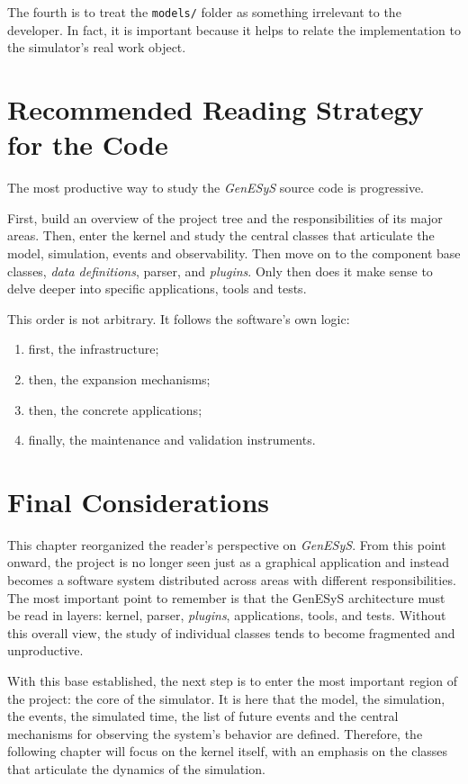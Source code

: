 The fourth is to treat the \texttt{models/} folder as something irrelevant to the developer. In fact, it is important because it helps to relate the implementation to the simulator's real work object.

\section{Recommended Reading Strategy for the Code}
\label{sec:cap6_estrategia_recomendada_leitura}

The most productive way to study the \textit{GenESyS} source code is progressive.

First, build an overview of the project tree and the responsibilities of its major areas. Then, enter the kernel and study the central classes that articulate the model, simulation, events and observability. Then move on to the component base classes, \textit{data definitions}, parser, and \textit{plugins}. Only then does it make sense to delve deeper into specific applications, tools and tests.

This order is not arbitrary. It follows the software's own logic:
\begin{enumerate}
 \item first, the infrastructure;
 \item then, the expansion mechanisms;
 \item then, the concrete applications;
 \item finally, the maintenance and validation instruments.
\end{enumerate}

\section{Final Considerations}
\label{sec:cap6_consideracoes_finais}

This chapter reorganized the reader's perspective on \textit{GenESyS}. From this point onward, the project is no longer seen just as a graphical application and instead becomes a software system distributed across areas with different responsibilities. The most important point to remember is that the GenESyS architecture must be read in layers: kernel, parser, \textit{plugins}, applications, tools, and tests. Without this overall view, the study of individual classes tends to become fragmented and unproductive.

With this base established, the next step is to enter the most important region of the project: the core of the simulator. It is here that the model, the simulation, the events, the simulated time, the list of future events and the central mechanisms for observing the system's behavior are defined. Therefore, the following chapter will focus on the kernel itself, with an emphasis on the classes that articulate the dynamics of the simulation.

